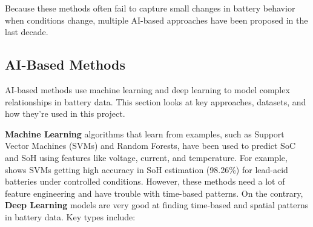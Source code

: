 Because these methods often fail to capture small changes in battery behavior when conditions change, multiple AI-based approaches have been proposed in the last decade.

\subsection{AI-Based Methods}
\label{subsec:ai_methods}
AI-based methods use machine learning and deep learning to model complex relationships in battery data. This section looks at key approaches, datasets, and how they're used in this project.

\textbf{Machine Learning} algorithms that learn from examples, such as Support Vector Machines (SVMs) and Random Forests, have been used to predict SoC and SoH using features like voltage, current, and temperature. For example, \cite{sun_simultaneous_2022} shows SVMs getting high accuracy in SoH estimation (98.26\%) for lead-acid batteries under controlled conditions. However, these methods need a lot of feature engineering and have trouble with time-based patterns. On the contrary, \textbf{Deep Learning} models are very good at finding time-based and spatial patterns in battery data. Key types include:
